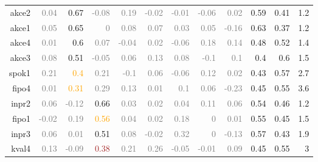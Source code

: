 \documentclass[10pt,a4paper]{article}
\begin{document}
\begin{table}[htbp]
\begin{tabular}{r|rrrrrrrr|rrr}
    akce2 & \textcolor{Gray}{0.04} & \textcolor{NavyBlue}{0.67} & \textcolor{Gray}{-0.08} & \textcolor{Gray}{0.19} & \textcolor{Gray}{-0.02} & \textcolor{Gray}{-0.01} & \textcolor{Gray}{-0.06} & \textcolor{Gray}{0.02} & 0.59 & 0.41 & 1.2 \\
    akce1 & \textcolor{Gray}{0.05} & \textcolor{NavyBlue}{0.65} & \textcolor{Gray}{0   } & \textcolor{Gray}{0.08} & \textcolor{Gray}{0.07} & \textcolor{Gray}{0.03} & \textcolor{Gray}{0.05} & \textcolor{Gray}{-0.16} & 0.63 & 0.37 & 1.2 \\
    akce4 & \textcolor{Gray}{0.01} & \textcolor{NavyBlue}{0.6} & \textcolor{Gray}{0.07} & \textcolor{Gray}{-0.04} & \textcolor{Gray}{0.02} & \textcolor{Gray}{-0.06} & \textcolor{Gray}{0.18} & \textcolor{Gray}{0.14} & 0.48 & 0.52 & 1.4 \\
    akce3 & \textcolor{Gray}{0.08} & \textcolor{NavyBlue}{0.51} & \textcolor{Gray}{-0.05} & \textcolor{Gray}{0.06} & \textcolor{Gray}{0.13} & \textcolor{Gray}{0.08} & \textcolor{Gray}{-0.1} & \textcolor{Gray}{0.1 } & 0.4 & 0.6 & 1.5 \\
    spok1 & \textcolor{Gray}{0.21} & \textcolor{Orange}{0.4}  & \textcolor{Gray}{0.21} & \textcolor{Gray}{-0.1} & \textcolor{Gray}{0.06} & \textcolor{Gray}{-0.06} & \textcolor{Gray}{0.12} & \textcolor{Gray}{0.02} & 0.43 & 0.57 & 2.7 \\
    fipo4 & \textcolor{Gray}{0.01} & \textcolor{Orange}{0.31} & \textcolor{Gray}{0.29} & \textcolor{Gray}{0.13} & \textcolor{Gray}{0.01} & \textcolor{Gray}{0.1 } & \textcolor{Gray}{0.06} & \textcolor{Gray}{-0.23} & 0.45 & 0.55 & 3.6 \\
    inpr2 & \textcolor{Gray}{0.06} & \textcolor{Gray}{-0.12} & \textcolor{NavyBlue}{0.66} & \textcolor{Gray}{0.03} & \textcolor{Gray}{0.02} & \textcolor{Gray}{0.04} & \textcolor{Gray}{0.11} & \textcolor{Gray}{0.06} & 0.54 & 0.46 & 1.2 \\
    fipo1 & \textcolor{Gray}{-0.02} & \textcolor{Gray}{0.19} & \textcolor{Orange}{0.56} & \textcolor{Gray}{0.04} & \textcolor{Gray}{0.02} & \textcolor{Gray}{0.18} & \textcolor{Gray}{0   } & \textcolor{Gray}{0.01} & 0.55 & 0.45 & 1.5 \\
    inpr3 & \textcolor{Gray}{0.06} & \textcolor{Gray}{0.01} & \textcolor{NavyBlue}{0.51} & \textcolor{Gray}{0.08} & \textcolor{Gray}{-0.02} & \textcolor{Gray}{0.32} & \textcolor{Gray}{0   } & \textcolor{Gray}{-0.13} & 0.57 & 0.43 & 1.9 \\
    kval4 & \textcolor{Gray}{0.13} & \textcolor{Gray}{-0.09} & \textcolor{Brown}{0.38} & \textcolor{Gray}{0.21} & \textcolor{Gray}{0.26} & \textcolor{Gray}{-0.05} & \textcolor{Gray}{-0.01} & \textcolor{Gray}{0.09} & 0.45 & 0.55 & 3 \\

\end{tabular}
\end{table}
\end{document}

